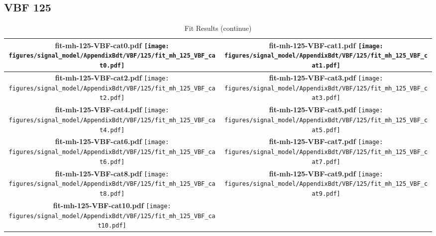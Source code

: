 \subsection{VBF 125}
\begin{longtable}{|c|c|}
\caption{Fit Results}
\endfirsthead
\caption{Fit Results (continue)}
\endhead
\hline
\parbox{0.47\textwidth}{
\centering
{\bfseries fit-mh-125-VBF-cat0.pdf}
\texttt{[image: figures/signal\_model/AppendixBdt/VBF/125/fit\_mh\_125\_VBF\_cat0.pdf]}
}
 & \parbox{0.47\textwidth}{
\centering
{\bfseries fit-mh-125-VBF-cat1.pdf}
\texttt{[image: figures/signal\_model/AppendixBdt/VBF/125/fit\_mh\_125\_VBF\_cat1.pdf]}
}
 \\
\hline
\parbox{0.47\textwidth}{
\centering
{\bfseries fit-mh-125-VBF-cat2.pdf}
\texttt{[image: figures/signal\_model/AppendixBdt/VBF/125/fit\_mh\_125\_VBF\_cat2.pdf]}
}
 & \parbox{0.47\textwidth}{
\centering
{\bfseries fit-mh-125-VBF-cat3.pdf}
\texttt{[image: figures/signal\_model/AppendixBdt/VBF/125/fit\_mh\_125\_VBF\_cat3.pdf]}
}
 \\
\hline
\parbox{0.47\textwidth}{
\centering
{\bfseries fit-mh-125-VBF-cat4.pdf}
\texttt{[image: figures/signal\_model/AppendixBdt/VBF/125/fit\_mh\_125\_VBF\_cat4.pdf]}
}
 & \parbox{0.47\textwidth}{
\centering
{\bfseries fit-mh-125-VBF-cat5.pdf}
\texttt{[image: figures/signal\_model/AppendixBdt/VBF/125/fit\_mh\_125\_VBF\_cat5.pdf]}
}
 \\
\hline
\parbox{0.47\textwidth}{
\centering
{\bfseries fit-mh-125-VBF-cat6.pdf}
\texttt{[image: figures/signal\_model/AppendixBdt/VBF/125/fit\_mh\_125\_VBF\_cat6.pdf]}
}
 & \parbox{0.47\textwidth}{
\centering
{\bfseries fit-mh-125-VBF-cat7.pdf}
\texttt{[image: figures/signal\_model/AppendixBdt/VBF/125/fit\_mh\_125\_VBF\_cat7.pdf]}
}
 \\
\hline
\parbox{0.47\textwidth}{
\centering
{\bfseries fit-mh-125-VBF-cat8.pdf}
\texttt{[image: figures/signal\_model/AppendixBdt/VBF/125/fit\_mh\_125\_VBF\_cat8.pdf]}
}
 & \parbox{0.47\textwidth}{
\centering
{\bfseries fit-mh-125-VBF-cat9.pdf}
\texttt{[image: figures/signal\_model/AppendixBdt/VBF/125/fit\_mh\_125\_VBF\_cat9.pdf]}
}
 \\
\hline
\parbox{0.47\textwidth}{
\centering
{\bfseries fit-mh-125-VBF-cat10.pdf}
\texttt{[image: figures/signal\_model/AppendixBdt/VBF/125/fit\_mh\_125\_VBF\_cat10.pdf]}
}
\end{longtable}
